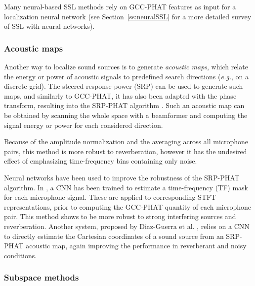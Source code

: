 Many neural-based SSL methods rely on GCC-PHAT features as input for a localization neural network \cite{xiao_learning-based_2015, vesperini_neural_2016, li_online_2018, comanducci_source_2020, vera-diaz_towards_2021} (see Section~\ref{ss:neuralSSL} for a more detailed survey of SSL with neural networks).

\subsubsection{Acoustic maps}

Another way to localize sound sources is to generate \textit{acoustic maps}, which relate the energy or power of acoustic signals to predefined search directions (\emph{e.g.}, on a discrete grid). The steered response power (SRP) can be used to generate such maps, and similarly to GCC-PHAT, it has also been adapted with the phase transform, resulting into the SRP-PHAT algorithm \cite{dmochowski_generalized_2007}. Such an acoustic map can be obtained by scanning the whole space with a beamformer and computing the signal energy or power for each considered direction.

Because of the amplitude normalization and the averaging across all microphone pairs, this method is more robust to reverberation, however it has the undesired effect of emphasizing time-frequency bins containing only noise.

Neural networks have been used to improve the robustness of the SRP-PHAT algorithm. In \cite{pertila_robust_2017}, a CNN has been trained to estimate a time-frequency (TF) mask for each microphone signal. These are applied to corresponding STFT representations, prior to computing the GCC-PHAT quantity of each microphone pair. This method shows to be more robust to strong interfering sources and reverberation. Another system, proposed by Diaz-Guerra et al. \cite{diaz-guerra_robust_2021}, relies on a CNN to directly estimate the Cartesian coordinates of a sound source from an SRP-PHAT acoustic map, again improving the performance in reverberant and noisy conditions.

\subsubsection{Subspace methods}

